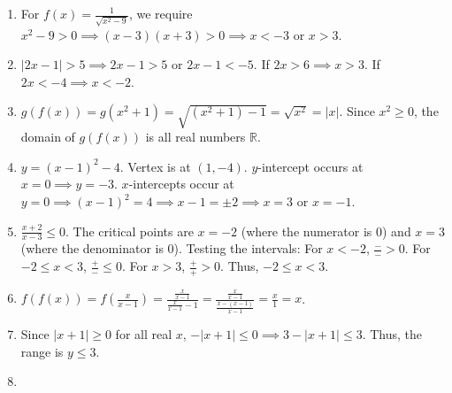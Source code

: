 \documentclass{article}
\begin{document}
\begin{enumerate}
    \item For $f(x) = \frac{1}{\sqrt{x^2 - 9}}$, we require $x^2 - 9 > 0 \implies (x-3)(x+3) > 0 \implies x < -3$ or $x > 3$.
    \vspace{0.5cm}

    \item $|2x - 1| > 5 \implies 2x - 1 > 5$ or $2x - 1 < -5$.
    If $2x > 6 \implies x > 3$.
    If $2x < -4 \implies x < -2$.
    \vspace{0.5cm}

    \item $g(f(x)) = g(x^2 + 1) = \sqrt{(x^2+1) - 1} = \sqrt{x^2} = |x|$.
    Since $x^2 \ge 0$, the domain of $g(f(x))$ is all real numbers $\mathbb{R}$.
    \vspace{0.5cm}

    \item $y = (x-1)^2 - 4$. Vertex is at $(1, -4)$.
    $y$-intercept occurs at $x=0 \implies y = -3$.
    $x$-intercepts occur at $y=0 \implies (x-1)^2 = 4 \implies x-1 = \pm 2 \implies x = 3$ or $x = -1$.
    \vspace{0.5cm}

    \item $\frac{x+2}{x-3} \le 0$. The critical points are $x = -2$ (where the numerator is 0) and $x = 3$ (where the denominator is 0). Testing the intervals:
    For $x < -2$, $\frac{-}{-} > 0$.
    For $-2 \le x < 3$, $\frac{+}{-} \le 0$.
    For $x > 3$, $\frac{+}{+} > 0$.
    Thus, $-2 \le x < 3$.
    \vspace{0.5cm}

    \item $f(f(x)) = f\left(\frac{x}{x-1}\right) = \frac{\frac{x}{x-1}}{\frac{x}{x-1} - 1} = \frac{\frac{x}{x-1}}{\frac{x - (x-1)}{x-1}} = \frac{x}{1} = x$.
    \vspace{0.5cm}

    \item Since $|x+1| \ge 0$ for all real $x$, $-|x+1| \le 0 \implies 3 - |x+1| \le 3$. Thus, the range is $y \le 3$.
    \vspace{0.5cm}

    \item 
    \vspace{0.5cm}


\end{enumerate}
\end{document}

